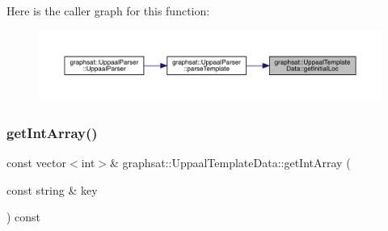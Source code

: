 Here is the caller graph for this function\+:
\nopagebreak
\begin{figure}[H]
\begin{center}
\leavevmode
\includegraphics[width=350pt]{classgraphsat_1_1_uppaal_template_data_a87b75bb520160d7c5d730d07d2700ec1_icgraph}
\end{center}
\end{figure}
\mbox{\label{classgraphsat_1_1_uppaal_template_data_a46c3566202741551f2eb16f82282bbbb}} 
\subsubsection{\texorpdfstring{getIntArray()}{getIntArray()}}
{\footnotesize\ttfamily const vector$<$int$>$\& graphsat\+::\+Uppaal\+Template\+Data\+::get\+Int\+Array (\begin{DoxyParamCaption}\item[{const string \&}]{key }\end{DoxyParamCaption}) const\hspace{0.3cm}{\ttfamily [inline]}}

